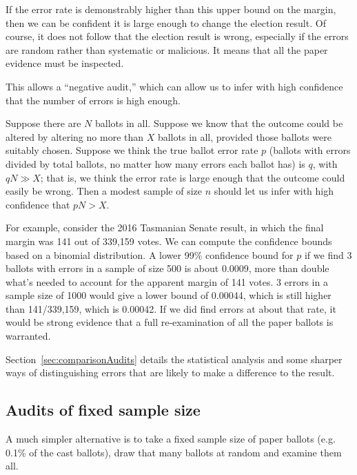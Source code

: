 \documentclass[10pt,a4paper]{article}
\newcommand{\VTNote}[1]{}
\newcommand{\longVersion}[1]{#1}
\newcommand{\longVersion}[1]{}
\begin{document}
If the error rate is demonstrably higher than this upper bound on the margin, then we can be confident it is large enough to change the election result. Of course, it does not follow that the election result is wrong, especially if the errors are random rather than systematic or malicious.  It means that all the paper evidence must be inspected.  

This allows a ``negative audit,'' which can allow us to infer with high confidence that the number of errors is high enough.   

Suppose there are $N$ ballots in all.
Suppose we know that the outcome could be altered by altering no more than $X$ ballots in all, provided those ballots were suitably chosen.  Suppose
we think the true ballot error rate $p$ (ballots with errors divided by total ballots, no matter how many errors each ballot has) is $q$, with $qN \gg X$; that is, we think the error rate is large enough that the outcome could easily be wrong.  Then a modest sample
of size $n$ should let us infer with high confidence that $pN > X$. 

For example, consider the 2016 Tasmanian Senate result, in which the final margin was 141 out of 339,159 votes.  We can compute the confidence bounds based on a binomial distribution.  A lower 99\% confidence bound for $p$ if we find 3 ballots with errors in a sample of size 500 is about 0.0009, more than double
what's needed to account for the apparent margin of 141 votes. 3 errors in a sample size of 1000 would give a lower bound of 0.00044, which is still higher than
141/339,159, which is 0.00042.  If we did find errors at about that rate, it would be strong evidence that a full re-examination of all the paper ballots is warranted.


\longVersion{Section~\ref{sec:comparisonAudits} details the statistical analysis and some sharper ways of distinguishing errors that are likely to make a difference to the result.  \VTNote{Actually I'm not sure it does.  Not sure there are any useful sharper distinctions.  Are the stats just binomial bounds again?}}

\subsection{Audits of fixed sample size} \label{subsec:fixedSize}
A much simpler alternative is to
take a fixed sample size of paper ballots (e.g. 0.1\% of the cast ballots), draw that
many ballots at random and examine them all.
\end{document}
